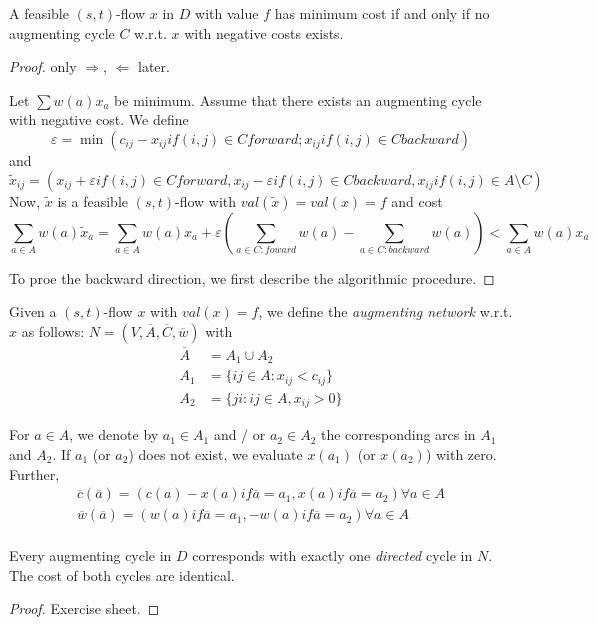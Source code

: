 \begin{thm}\label{thm:thm164}
A feasible $(s,t)$-flow $x$ in $D$ with value $f$ has minimum cost if and
only if no augmenting cycle $C$ w.r.t. $x$ with negative costs exists.
\end{thm}
\begin{proof}
only $\Rightarrow$, $\Leftarrow$ later.

Let $\sum w(a) x_a$ be minimum. Assume that there exists an augmenting cycle
with negative cost. We define
\[
	\varepsilon = \min ( c_{ij} - x_{ij} if (i,j) \in C forward ; x_{ij} if
	(i,j) \in C backward )
\]
and 
\[
	\tilde{x}_{ij} = ( x_{ij} + \varepsilon if (i,j) \in C forward, 
	x_{ij} - \varepsilon if (i,j) \in C backward,
	x_{ij} if (i,j) \in A \setminus C
	)
\]
Now, $\tilde{x}$ is a feasible $(s,t)$-flow with $val(\tilde{x}) = val(x) =
f$ and cost
\[
	\sum_{a \in A} w(a) \tilde{x}_a = \sum_{a \in A} w(a) x_a + \varepsilon
	\left( \sum_{a \in C: foward} w(a) - \sum_{a \in C: backward} w(a) \right)
	< \sum_{a \in A} w(a) x_a
\]

To proe the backward direction, we first describe the algorithmic procedure.
\end{proof}

\begin{defn}
Given a $(s,t)$-flow $x$ with $val(x) = f$, we define the \emph{augmenting
network} w.r.t. $x$ as follows: $N = (V, \overline{A}, \overline{C},
\overline{w})$ with
\begin{align*}
\overline{A} &= A_1 \cup A_2 \\
A_1 &= \{ ij \in A: x_{ij} < c_{ij} \} \\
A_2 &= \{ ji: ij \in A, x_{ij} > 0 \}
\end{align*}

For $a \in A$, we denote by $a_1 \in A_1$ and / or $a_2 \in A_2$ the
corresponding arcs in $A_1$ and $A_2$. If $a_1$ (or $a_2$) does not exist,
we evaluate $x(a_1)$ (or $x(a_2)$) with zero.
Further,
\begin{align*}
\overline{c}(\overline{a}) = ( c(a) - x(a) if \overline{a} = a_1, 
x(a) if \overline{a} = a_2) \forall a \in A \\
\overline{w}(\overline{a}) = ( w(a) if \overline{a} = a_1, 
-w(a) if \overline{a} = a_2) \forall a \in A \\
\end{align*}
\end{defn}

\begin{lem}
Every augmenting cycle in $D$ corresponds with exactly one \emph{directed}
cycle in $N$. The cost of both cycles are identical.
\end{lem}
\begin{proof}
Exercise sheet.
\end{proof}

